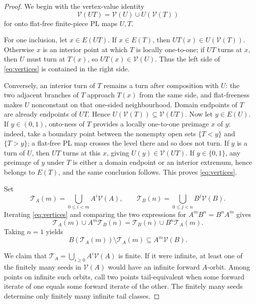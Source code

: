 \documentclass[11pt]{article}
\begin{document}
\begin{proof}
We begin with the vertex-value identity
\begin{equation}\label{eq:vertices}
\mathcal V(UT)=\mathcal V(U)\cup U(\mathcal V(T))
\end{equation}
for onto flat-free finite-piece PL maps $U,T$.

For one inclusion, let $x\in E(UT)$. If $x\in E(T)$, then
$UT(x)\in U(\mathcal V(T))$. Otherwise $x$ is an interior point at which $T$ is locally one-to-one;
if $UT$ turns at $x$, then $U$ must turn at $T(x)$, so $UT(x)\in\mathcal V(U)$. Thus the left side
of \eqref{eq:vertices} is contained in the right side.

Conversely, an interior turn of $T$ remains a turn after composition with $U$: the two adjacent branches
of $T$ approach $T(x)$ from the same side, and flat-freeness makes $U$ nonconstant on that one-sided
neighbourhood. Domain endpoints of $T$ are already endpoints of $UT$. Hence
$U(\mathcal V(T))\subseteq\mathcal V(UT)$. Now let $y\in E(U)$. If $y\in(0,1)$, onto-ness of $T$
provides a locally one-to-one preimage $x$ of $y$: indeed, take a boundary point between the nonempty
open sets $\{T<y\}$ and $\{T>y\}$; a flat-free PL map crosses the level there and so does not turn.
If $y$ is a turn of $U$, then $UT$ turns at this $x$, giving $U(y)\in\mathcal V(UT)$. If
$y\in\{0,1\}$, any preimage of $y$ under $T$ is either a domain endpoint or an interior extremum, hence
belongs to $E(T)$, and the same conclusion follows. This proves \eqref{eq:vertices}.

Set
\[
\mathcal T_A(m)=\bigcup_{0\le i<m}A^i\mathcal V(A),\qquad
\mathcal T_B(n)=\bigcup_{0\le j<n}B^j\mathcal V(B).
\]
Iterating \eqref{eq:vertices} and comparing the two expressions for $A^mB^n=B^nA^m$ gives
\begin{equation}\label{eq:rectangle}
\mathcal T_A(m)\cup A^m\mathcal T_B(n)
 =\mathcal T_B(n)\cup B^n\mathcal T_A(m).
\end{equation}
Taking $n=1$ yields
\begin{equation}\label{eq:difference}
B(\mathcal T_A(m))\setminus\mathcal T_A(m)\subseteq A^m\mathcal V(B).
\end{equation}

We claim that $\mathcal T_A=\bigcup_{i\ge0}A^i\mathcal V(A)$ is finite. If it were infinite, at least one
of the finitely many seeds in $\mathcal V(A)$ would have an infinite forward $A$-orbit. Among points on
infinite such orbits, call two points tail-equivalent when some forward iterate of one equals some forward
iterate of the other. The finitely many seeds determine only finitely many infinite tail classes.


\end{proof}
\end{document}
